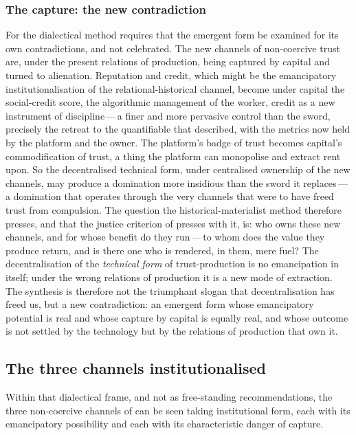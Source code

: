 \subsubsection{The capture: the new contradiction}
\label{p13:sub:jud-capture}

For the dialectical method requires that the emergent form be examined for its own contradictions, and not celebrated. The new channels of non-coercive trust are, under the present relations of production, being captured by capital and turned to alienation. Reputation and credit, which might be the emancipatory institutionalisation of the relational-historical channel, become under capital the social-credit score, the algorithmic management of the worker, credit as a new instrument of discipline\,---\,a finer and more pervasive control than the sword, precisely the retreat to the quantifiable that  described, with the metrics now held by the platform and the owner. The platform's badge of trust becomes capital's commodification of trust, a thing the platform can monopolise and extract rent upon. So the decentralised technical form, under centralised ownership of the new channels, may produce a domination more insidious than the sword it replaces\,---\,a domination that operates through the very channels that were to have freed trust from compulsion. The question the historical-materialist method therefore presses, and that the justice criterion of  presses with it, is: who owns these new channels, and for whose benefit do they run\,---\,to whom does the value they produce return, and is there one who is rendered, in them, mere fuel? The decentralisation of the \emph{technical form} of trust-production is no emancipation in itself; under the wrong relations of production it is a new mode of extraction. The synthesis is therefore not the triumphant slogan that decentralisation has freed us, but a new contradiction: an emergent form whose emancipatory potential is real and whose capture by capital is equally real, and whose outcome is not settled by the technology but by the relations of production that own it.

\subsection{The three channels institutionalised}
\label{p13:sub:jud-channels}

Within that dialectical frame, and not as free-standing recommendations, the three non-coercive channels of  can be seen taking institutional form, each with its emancipatory possibility and each with its characteristic danger of capture.

